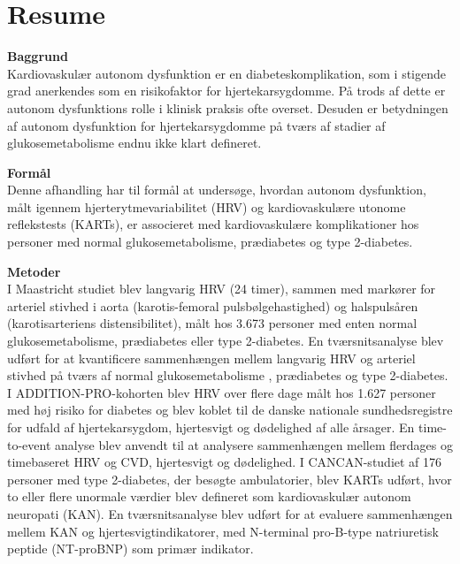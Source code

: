 \documentclass[
  a4paper,
  headsepline=true,
  open=left]{scrbook}
\begin{document}

\hypertarget{resume}{%
\chapter*{Resume}\label{resume}}


\clearpage
\null
\thispagestyle{empty}
\clearpage

\textbf{Baggrund}\\
Kardiovaskulær autonom dysfunktion er en diabeteskomplikation, som i
stigende grad anerkendes som en risikofaktor for hjertekarsygdomme. På
trods af dette er autonom dysfunktions rolle i klinisk praksis ofte
overset. Desuden er betydningen af autonom dysfunktion for
hjertekarsygdomme på tværs af stadier af glukosemetabolisme endnu ikke
klart defineret.

\textbf{Formål}\\
Denne afhandling har til formål at undersøge, hvordan autonom
dysfunktion, målt igennem hjerterytmevariabilitet (HRV) og
kardiovaskulære utonome reflekstests (KARTs), er associeret med
kardiovaskulære komplikationer hos personer med normal
glukosemetabolisme, prædiabetes og type 2-diabetes.

\textbf{Metoder}\\
I Maastricht studiet blev langvarig HRV (24 timer), sammen med markører
for arteriel stivhed i aorta (karotis-femoral pulsbølgehastighed) og
halspulsåren (karotisarteriens distensibilitet), målt hos 3.673 personer
med enten normal glukosemetabolisme, prædiabetes eller type 2-diabetes.
En tværsnitsanalyse blev udført for at kvantificere sammenhængen mellem
langvarig HRV og arteriel stivhed på tværs af normal glukosemetabolisme
, prædiabetes og type 2-diabetes. I ADDITION-PRO-kohorten blev HRV over
flere dage målt hos 1.627 personer med høj risiko for diabetes og blev
koblet til de danske nationale sundhedsregistre for udfald af
hjertekarsygdom, hjertesvigt og dødelighed af alle årsager. En
time-to-event analyse blev anvendt til at analysere sammenhængen mellem
flerdages og timebaseret HRV og CVD, hjertesvigt og dødelighed. I
CANCAN-studiet af 176 personer med type 2-diabetes, der besøgte
ambulatorier, blev KARTs udført, hvor to eller flere unormale værdier
blev defineret som kardiovaskulær autonom neuropati (KAN). En
tværsnitsanalyse blev udført for at evaluere sammenhængen mellem KAN og
hjertesvigtindikatorer, med N-terminal pro-B-type natriuretisk peptide
(NT-proBNP) som primær indikator.
\end{document}
